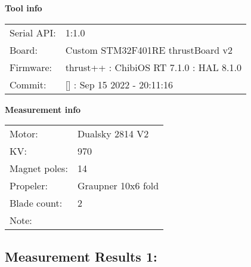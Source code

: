 \documentclass[10pt]{article}
\begin{document}
\noindent
{\large \bf Tool info}
\vspace{3mm}

\noindent
\begin{tabular}{ll}
Serial API:  & 1:1.0\\ 
Board:       & Custom STM32F401RE thrustBoard v2\\ 
Firmware:    & thrust++ : ChibiOS RT 7.1.0 : HAL 8.1.0\\ 
Commit:      & [] : Sep 15 2022 - 20:11:16
\end{tabular}
\vspace{3mm}

\noindent
{\large \bf Measurement info}
\vspace{3mm}

\noindent
\begin{tabular}{ll}
Motor:        & Dualsky 2814 V2\\ 
KV:           & 970\\ 
Magnet poles: & 14\\ 
Propeler:     & Graupner 10x6 fold\\ 
Blade count:  & 2\\ 
Note:         & 
\end{tabular}

\vspace{3mm}


\subsection*{\large \bf Measurement Results 1:}
\end{document}
